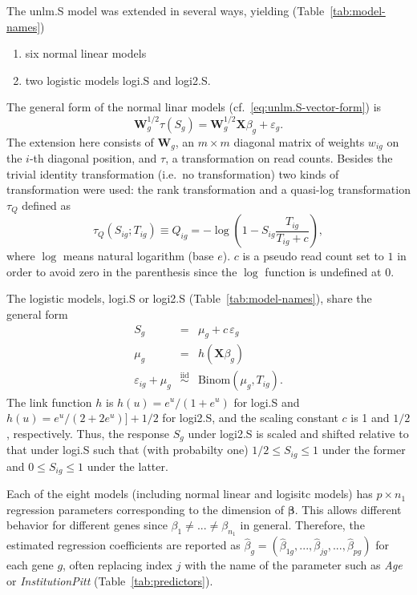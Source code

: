 \documentclass[12pt,letterpaper]{article}
\begin{document}
The unlm.S model was extended in several ways, yielding (Table~\ref{tab:model-names})
\begin{enumerate}
\item six normal linear models
\item two logistic models logi.S and logi2.S.
\end{enumerate}

The general form of the normal linar models
(cf.~\ref{eq:unlm.S-vector-form}) is
\begin{equation}
\mathbf{W}_g^{1/2} \tau(S_g) = \mathbf{W}_g^{1/2} \mathbf{X} \beta_g + \varepsilon_g.
\label{eq:nlm-general}
\end{equation}
The extension here consists of \(\mathbf{W}_g\), an \(m\times m\) diagonal matrix of
weights \(w_{ig}\) on the \(i\)-th diagonal position, and \(\tau\), a
transformation on read counts.  Besides the trivial identity transformation
(i.e.~no transformation) two kinds of transformation were used: the rank
transformation and a quasi-log transformation \(\tau_Q\) defined as
\begin{equation}
\tau_Q(S_{ig};T_{ig}) \equiv Q_{ig} = - \log \left( 1 - S_{ig} \frac{T_{ig}}{T_{ig} + c}
\right),
\label{eq:Q}
\end{equation}
where \(\log\) means natural logarithm (base \(e\)).  \(c\) is a pseudo read
count set to \(1\) in order to avoid zero in the parenthesis since the \(\log\)
function is undefined at \(0\).

The logistic models, logi.S or logi2.S (Table~\ref{tab:model-names}), share the general form
\begin{eqnarray}
S_g &=& \mu_g + c\, \varepsilon_g
\label{eq:logi-general}
\\
\mu_g &=& h(\mathbf{X} \beta_g)
\label{eq:glm-mean-predictor}
\\
\varepsilon_{ig} + \mu_g &\overset{\mathrm{iid}}{\sim}& \mathrm{Binom}(\mu_g, T_{ig}).
\label{eq:binom-error}
\end{eqnarray}
The link function \(h\) is \(h(u) = e^u / (1 + e^u)\) for logi.S and \(h(u) =
e^u / (2 + 2e^u)] + 1/2\) for logi2.S, and the scaling constant \(c\) is 1
 and \(1/2\), respectively.  Thus, the response \(S_g\) under logi2.S is scaled and shifted relative to
that under logi.S such that (with probabilty one) \(1/2\le S_{ig}\le 1\) under the former and
\(0\le S_{ig}\le 1\) under the latter.

Each of the eight models (including normal linear and logisitc models) has \(p\times n_1\) regression parameters corresponding to the
dimension of \(\boldsymbol{\beta}\).  This allows different behavior for
different genes since \(\beta_1\neq ...\neq\beta_{n_1}\) in general.
Therefore, the estimated regression coefficients are reported as \(\hat{\beta}_g =
(\hat{\beta}_{1g},...,\hat{\beta}_{jg},...,\hat{\beta}_{pg})\) for each gene \(g\), often
replacing index \(j\) with the name of the parameter such as \emph{Age} or
\emph{InstitutionPitt} (Table~\ref{tab:predictors}).
\end{document}
